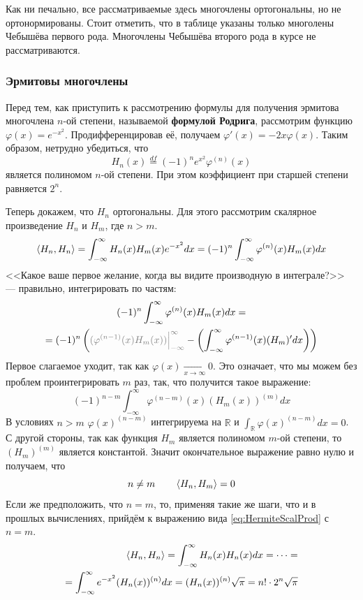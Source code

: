 \documentclass[12pt]{article}
\begin{document}
		Как ни печально, все рассматриваемые здесь многочлены ортогональны, но не ортонормированы.
		Стоит отметить, что в таблице указаны только многолены Чебышёва первого рода. Многочлены Чебышёва второго рода в курсе 
		не рассматриваются.
	
		\subsubsection{Эрмитовы многочлены}
	
		Перед тем, как приступить к рассмотрению формулы для получения эрмитова многочлена $n$-ой степени, называемой 
		\textbf{формулой Родрига}, рассмотрим функцию $\varphi(x) = e^{-x^2}$. Продифференцировав её, получаем 
		$\varphi'(x) = -2x \varphi(x)$. Таким образом, нетрудно убедиться, что
		$$H_n(x) \overset{df}{=} (-1)^n e^{x^2} \varphi^{(n)} (x)$$
		является полиномом $n$-ой степени. При этом коэффициент при старшей степени равняется $2^n$.
	
		Теперь докажем, что $H_n$ ортогональны. Для этого рассмотрим скалярное произведение $H_n$ и $H_m$, где $n > m$.
		$$\left\langle H_n, H_n \right\rangle = \int_{-\infty}^{\infty} H_n(x) H_m(x) e^{-x^2} dx = (-1)^n \int_{-\infty}^{\infty} \varphi^{(n)}(x) H_m(x) dx$$
		<<Какое ваше первое желание, когда вы видите производную в интеграле?>> --- правильно, интегрировать по частям:
		\begin{gather*}
			(-1)^n \int_{-\infty}^{\infty} \varphi^{(n)}(x) H_m(x) dx = \\
			= (-1)^n \left( {\color{gray}(\varphi^{(n-1)}(x) H_m(x)) \lims{-\infty}{\infty}}
			- \left(\int_{-\infty}^{\infty} \varphi^{(n-1)}(x) (H_m)' dx \right) \right)
		\end{gather*}
		Первое слагаемое уходит, так как $\varphi(x) \underset{x \rightarrow \infty}{\rightarrow} 0$. Это означает, что мы можем без проблем
		проинтегрировать $m$ раз, так, что получится такое выражение:
		\begin{equation} \label{eq:HermiteScalProd}
			(-1)^{n-m} \int_{-\infty}^{\infty} \varphi^{(n-m)}(x) (H_m(x))^{(m)} dx
		\end{equation}
		В условиях $n > m$ $\varphi(x)^{(n-m)}$ интегрируема на $\mathbb{R}$ и $\int_{\mathbb{R}} \varphi(x)^{(n-m)} dx = 0$. С другой 
		стороны, так как функция $H_m$ является полиномом $m$-ой степени, то $(H_m)^{(m)}$ является константой. Значит окончательное выражение
		равно нулю и получаем, что
		$$n \neq m \qquad \left\langle H_n, H_m \right\rangle = 0$$
		Если же предположить, что $n=m$, то, применяя такие же шаги, что и в прошлых вычислениях, прийдём к выражению вида 
		\ref{eq:HermiteScalProd} с $n=m$. 
		\begin{align*}
			\left\langle H_n, H_n \right\rangle = \int_{-\infty}^{\infty} H_n(x) H_n(x) dx = \dots = \\
			= \int_{-\infty}^{\infty} e^{-x^2} (H_n(x))^{(n)} dx = (H_n(x))^{(n)} \sqrt{\pi} = n! \cdot 2^n \sqrt{\pi}
		\end{align*}
	
\end{document}
